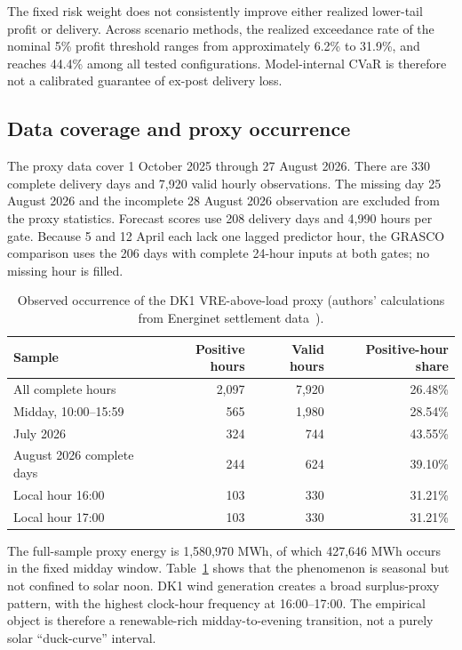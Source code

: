 \documentclass[11pt,a4paper]{article}
\begin{document}
The fixed risk weight does not consistently improve either realized lower-tail
profit or delivery.  Across scenario methods, the realized exceedance rate of
the nominal 5\% profit threshold ranges from approximately 6.2\% to 31.9\%,
and reaches 44.4\% among all tested configurations.  Model-internal CVaR is
therefore not a calibrated guarantee of ex-post delivery loss.

\subsection{Data coverage and proxy occurrence}

The proxy data cover 1 October 2025 through 27 August 2026.  There are 330
complete delivery days and 7,920 valid hourly observations.  The missing day
25 August 2026 and the incomplete 28 August 2026 observation are excluded from
the proxy statistics.  Forecast scores use 208 delivery days and 4,990 hours
per gate.  Because 5 and 12 April each lack one lagged predictor hour, the
GRASCO comparison uses the 206 days with complete 24-hour inputs
at both gates; no missing hour is filled.

\begin{table}[htbp]
  \centering
  \caption{Observed occurrence of the DK1 VRE-above-load proxy (authors'
  calculations from Energinet settlement data~\cite{energineteds}).}
  \begin{tabular}{lrrr}
    \toprule
    Sample & Positive hours & Valid hours & Positive-hour share \\
    \midrule
    All complete hours & 2,097 & 7,920 & 26.48\% \\
    Midday, 10:00--15:59 & 565 & 1,980 & 28.54\% \\
    July 2026 & 324 & 744 & 43.55\% \\
    August 2026 complete days & 244 & 624 & 39.10\% \\
    Local hour 16:00 & 103 & 330 & 31.21\% \\
    Local hour 17:00 & 103 & 330 & 31.21\% \\
    \bottomrule
  \end{tabular}
  \label{tab:proxy-occurrence}
\end{table}

The full-sample proxy energy is 1,580,970 MWh, of which 427,646 MWh occurs in
the fixed midday window.  Table~\ref{tab:proxy-occurrence} shows that the
phenomenon is seasonal but not confined to solar noon.  DK1 wind generation
creates a broad surplus-proxy pattern, with the highest clock-hour frequency at
16:00--17:00.  The empirical object is therefore a renewable-rich
midday-to-evening transition, not a purely solar ``duck-curve'' interval.
\end{document}
